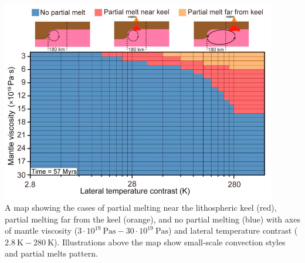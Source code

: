 \begin{center}
\includegraphics[width=12cm]{python_codes/fieldstone_168/images/kiso20f.jpg}\\
{\captionfont A map showing the cases of partial melting
near the lithospheric keel (red), partial melting far
from the keel (orange), and no partial melting (blue)
with axes of mantle viscosity ($3\cdot 10^{19}~\si{\pascal\second}- 30\cdot 10^{19}~\si{\pascal\second}$) 
and lateral temperature contrast ($2.8~\si{\kelvin}-280~\si{\kelvin}$). 
Illustrations above the map show small-scale convection styles and partial melts pattern.}
\end{center}





